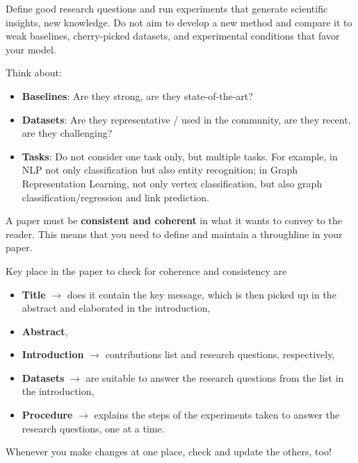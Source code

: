 \documentclass[sigconf, review, nonacm]{acmart}
\begin{document}
\begin{tcolorbox}[title=What is Strong and Ego-less Research?,colback=red!20]
Define good research questions and run experiments that generate scientific insights, \ie new knowledge.
Do not aim to develop a new method and compare it to weak baselines, cherry-picked datasets, and experimental conditions that favor your model.

Think about:

\begin{itemize}
\item \textbf{Baselines}: Are they strong, are they state-of-the-art?

\item \textbf{Datasets}: Are they representative / used in the community, are they recent, are they challenging?

\item \textbf{Tasks}: Do not consider one task only, but multiple tasks. 
For example, in NLP not only classification but also entity recognition; in Graph Representation Learning, not only vertex classification, but also graph classification/regression and link prediction.
\end{itemize}

\end{tcolorbox}


\begin{tcolorbox}[title=Have a throughline in your paper and maintain it!,colback=red!20]
    A paper must be \textbf{consistent and coherent} in what it wants to convey to the reader.
    This means that you need to define and maintain a throughline in your paper.

    Key place in the paper to check for coherence and consistency are
    \begin{itemize}
        \item \textbf{Title} $\rightarrow$ does it contain the key message, which is then picked up in the abstract and elaborated in the introduction, 
        \item \textbf{Abstract}, 
        \item \textbf{Introduction} $\rightarrow$ contributions list and research questions, respectively, 
        \item \textbf{Datasets} $\rightarrow$  are suitable to answer the research questions from the list in the introduction,
        \item \textbf{Procedure} $\rightarrow$ explains the steps of the experiments taken to answer the research questions, one at a time.
    \end{itemize}


    Whenever you make changes at one place, check and update the others, too!
\end{tcolorbox}
\end{document}

